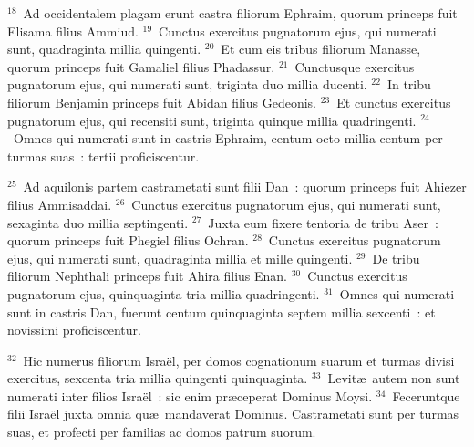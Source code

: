 ${}^{18}$~Ad occidentalem plagam erunt castra filiorum Ephraim, quorum princeps fuit Elisama filius Ammiud.
${}^{19}$~Cunctus exercitus pugnatorum ejus, qui numerati sunt, quadraginta millia quingenti.
${}^{20}$~Et cum eis tribus filiorum Manasse, quorum princeps fuit Gamaliel filius Phadassur.
${}^{21}$~Cunctusque exercitus pugnatorum ejus, qui numerati sunt, triginta duo millia ducenti.
${}^{22}$~In tribu filiorum Benjamin princeps fuit Abidan filius Gedeonis.
${}^{23}$~Et cunctus exercitus pugnatorum ejus, qui recensiti sunt, triginta quinque millia quadringenti.
${}^{24}$~Omnes qui numerati sunt in castris Ephraim, centum octo millia centum per turmas suas~: tertii proficiscentur.


${}^{25}$~Ad aquilonis partem castrametati sunt filii Dan~: quorum princeps fuit Ahiezer filius Ammisaddai.
${}^{26}$~Cunctus exercitus pugnatorum ejus, qui numerati sunt, sexaginta duo millia septingenti.
${}^{27}$~Juxta eum fixere tentoria de tribu Aser~: quorum princeps fuit Phegiel filius Ochran.
${}^{28}$~Cunctus exercitus pugnatorum ejus, qui numerati sunt, quadraginta millia et mille quingenti.
${}^{29}$~De tribu filiorum Nephthali princeps fuit Ahira filius Enan.
${}^{30}$~Cunctus exercitus pugnatorum ejus, quinquaginta tria millia quadringenti.
${}^{31}$~Omnes qui numerati sunt in castris Dan, fuerunt centum quinquaginta septem millia sexcenti~: et novissimi proficiscentur.


${}^{32}$~Hic numerus filiorum Isra\"el, per domos cognationum suarum et turmas divisi exercitus, sexcenta tria millia quingenti quinquaginta.
${}^{33}$~Levit\ae\ autem non sunt numerati inter filios Isra\"el~: sic enim pr\ae ceperat Dominus Moysi.
${}^{34}$~Feceruntque filii Isra\"el juxta omnia qu\ae\ mandaverat Dominus. Castrametati sunt per turmas suas, et profecti per familias ac domos patrum suorum.

